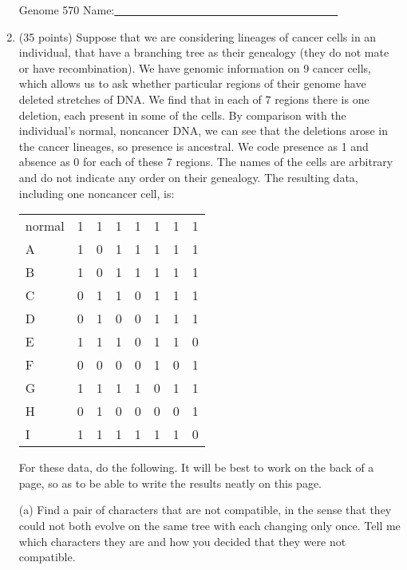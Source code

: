 \documentclass[12pt]{article}
\begin{document}
\begin{enumerate}
\newpage

\noindent
Genome 570 \hfill Name:\underline{~~~~~~~~~~~~~~~~~~~~~~~~~~~~~~~~~~~~~~~~}\\
\medskip

\item (35 points)  Suppose that we are considering lineages of cancer cells in an
individual, that have
a branching tree as their genealogy (they do not mate or have recombination).  We have
genomic information on 9 cancer cells, which allows us to ask whether particular regions of
their genome have deleted stretches of DNA.  We find that in each of 7 regions there is one
deletion, each present in some of the cells.  By comparison with the individual's
normal, noncancer DNA, we can see that the deletions arose in the cancer lineages, so
presence is ancestral.  We code presence as 1 and absence as 0 for each of
these 7
regions.  The names of the cells are arbitrary and do not indicate any order on their
genealogy.  The resulting data, including one noncancer cell, is:
\medskip

\begin{center}
\begin{tabular}{l | c c c c c c c}
\cline{2-8}
normal &   1 & 1 & 1 & 1 & 1 & 1 & 1\\
A      &   1 & 0 & 1 & 1 & 1 & 1 & 1\\
B      &   1 & 0 & 1 & 1 & 1 & 1 & 1\\
C      &   0 & 1 & 1 & 0 & 1 & 1 & 1\\
D      &   0 & 1 & 0 & 0 & 1 & 1 & 1\\
E      &   1 & 1 & 1 & 0 & 1 & 1 & 0\\
F      &   0 & 0 & 0 & 0 & 1 & 0 & 1\\
G      &   1 & 1 & 1 & 1 & 0 & 1 & 1\\
H      &   0 & 1 & 0 & 0 & 0 & 0 & 1\\
I      &   1 & 1 & 1 & 1 & 1 & 1 & 0\\
\end{tabular}
\end{center}

For these data, do the following.  It will be best to work on the
back of a page,
so as to be
able to write the results neatly on this page.
\medskip

(a) Find a pair of characters that are not compatible, in the sense that they could not both evolve on the same tree with each changing only
once.  Tell me which characters they are and how you decided that
they were not compatible.
\vfill



\end{enumerate}
\end{document}
